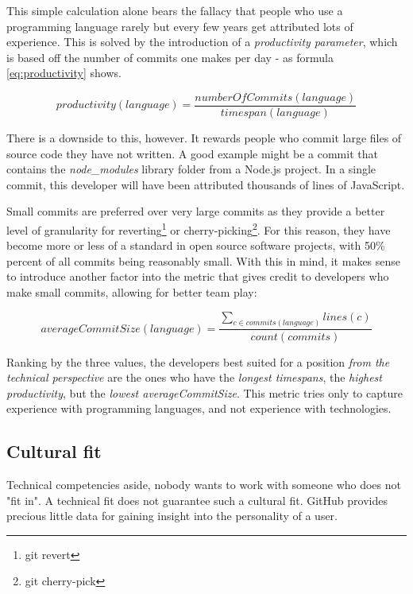 This simple calculation alone bears the fallacy that people who use a programming language rarely but every few years get attributed lots of experience. This is solved by the introduction of a \textit{productivity parameter}, which is based off the number of commits one makes per day - as formula \ref{eq:productivity} shows.

\begin{equation}
productivity(language) = \frac{numberOfCommits(language)}{timespan(language)}
\label{eq:productivity}
\end{equation}

There is a downside to this, however. It rewards people who commit large files of source code they have not written. A good example might be a commit that contains the \textit{node\_modules} library folder from a Node.js project. In a single commit, this developer will have been attributed thousands of lines of JavaScript.

Small commits are preferred \cite{so:commitsize} over very large commits as they provide a better level of granularity for reverting\footnote{git revert} or cherry-picking\footnote{git cherry-pick}. For this reason, they have become more or less of a standard in open source software projects, with 50\% percent of all commits being reasonably small\cite{rsk:2014}. With this in mind, it makes sense to introduce another factor into the metric that gives credit to developers who make small commits, allowing for better team play:

\begin{equation}
averageCommitSize(language) = \frac{\sum_{c \in commits(language)} lines(c)}{count(commits)}
\label {eq:avgcommitsize}
\end{equation}

Ranking by the three values, the developers best suited for a position \textit{from the technical perspective} are the ones who have the \textit{longest timespans}, the \textit{highest productivity}, but the \textit{lowest averageCommitSize}. This metric tries only to capture experience with programming languages, and not experience with technologies.

\subsection{Cultural fit}
Technical competencies aside, nobody wants to work with someone who does not "fit in".
A technical fit does not guarantee such a cultural fit. GitHub provides precious little data for gaining insight into the personality of a user.

